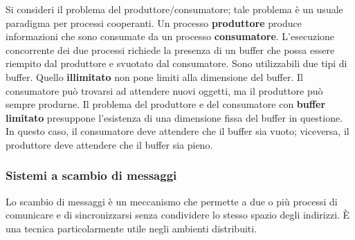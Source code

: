 \documentclass[11pt,a4paper]{article}
\begin{document}
Si consideri il problema del pro­duttore/consumatore; tale problema è un usuale paradigma per processi cooperanti. Un
processo \textbf{produttore} produce informazioni che sono consumate da un processo \textbf{consumato­re}.
L'esecuzione concorrente dei due processi richiede la presenza di un buffer che
possa essere riempito dal produttore e svuotato dal consumatore.
Sono utilizzabili due tipi di buffer. Quello \textbf{illimitato} non pone limiti alla dimensione del
buffer. Il consumatore può trovarsi ad attendere nuovi oggetti, ma il produttore può sempre
produrne. Il problema del produttore e del consumatore con \textbf{buffer limitato} presuppone l'esi­stenza di una dimensione fissa del buffer in questione. In questo caso, il consumatore deve at­tendere che il buffer sia vuoto; viceversa, il produttore deve attendere che il buffer sia pieno.

\subsubsection{Sistemi a scambio di messaggi}
Lo scambio di messaggi è un meccanismo che permette a due o più processi di comu­nicare e di sincronizzarsi senza condividere lo stesso spazio degli indirizzi. È una tecnica par­ticolarmente utile negli ambienti distribuiti.
\end{document}

